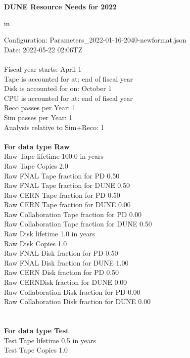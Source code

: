 \documentclass[12pt]{article}
\begin{document}
\centerline{\bf{DUNE Resource Needs for 2022}} in \par Configuration: Parameters\_2022-01-16-2040-newformat.json\\
  Date: 2022-05-22 02:06TZ\\
   \\
  
 Fiscal year starts: April 1\\ 
Tape is accounted for at: end of fiscal year\\ 
Disk is accounted for on: October 1\\ 
CPU is accounted for at: end of fiscal year\\ 
Reco passes per Year: 1\\
Sim passes per Year: 1\\
Analysis relative to Sim+Reco: 1\\
\pagebreak
\\
{\bf For data type Raw}\\
   Raw Tape lifetime 100.0 in years\\
   Raw Tape Copies   2.0\\
   Raw FNAL Tape fraction for PD  0.50\\
   Raw FNAL Tape fraction for DUNE  0.50\\
   Raw CERN Tape fraction for PD  0.50\\
   Raw CERN Tape fraction for DUNE  0.00\\
   Raw Collaboration Tape fraction for PD  0.00\\
   Raw Collaboration Tape fraction for DUNE  0.50\\
   Raw Disk lifetime   1.0 in years\\
   Raw Disk Copies   1.0\\
   Raw FNAL Disk fraction for PD  0.50\\
   Raw FNAL Disk fraction for DUNE  1.00\\
   Raw CERN Disk fraction for PD  0.50\\
   Raw CERNDisk fraction for DUNE  0.00\\
   Raw Collaboration Disk fraction for PD  0.00\\
   Raw Collaboration Disk fraction for DUNE  0.00\\
\pagebreak\\
\\
{\bf For data type Test}\\
  Test Tape lifetime   0.5 in years\\
  Test Tape Copies   1.0\\
\end{document}
